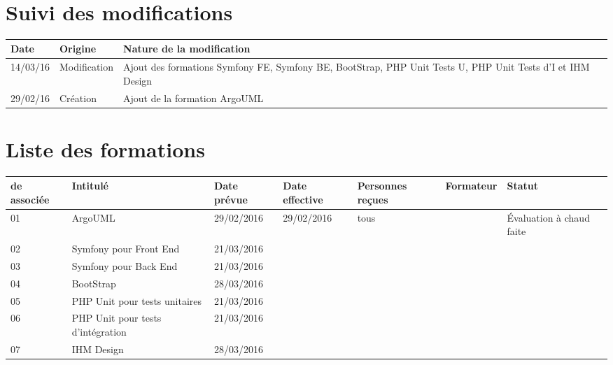 \documentclass[asi,sansVersion]{picInsa}
\begin{document}
	\begin{center}
		\LARGE
		\textsc{
			\PF{}\\
		}
	\end{center}
	\vspace{0.5cm}

	\section*{Suivi des modifications}
	\begin{table}[H]
		\centering
		\begin{tabularx}{18cm}{|p{1.7cm}|p{4cm}|X|}
		\hline
		\rowcolor[gray]{0.85} Date & Origine & Nature de la modification\\\hline
		14/03/16 & Modification & Ajout des formations Symfony FE, Symfony BE, BootStrap, PHP Unit Tests U, PHP Unit Tests d'I et IHM Design \\ \hline
		29/02/16 & Création & Ajout de la formation ArgoUML\\ \hline
		
		\end{tabularx}
	\end{table}
	
	\section*{Liste des formations}
		\begin{longtable}{|p{2cm}|p{3.5cm}|p{2cm}|p{2cm}|p{2cm}|c|p{2cm}|}
			\hline
			\rowcolor{gris2}
			\No{} de \FFCourt{} associée & Intitulé & Date prévue & Date effective & Personnes reçues & Formateur & Statut \\\hline
			01 & ArgoUML & 29/02/2016 & 29/02/2016 & tous & \Julie{} & Évaluation à chaud faite\\\hline
			02 & Symfony pour Front End & 21/03/2016 &  &  &  & \\\hline
			03 & Symfony pour Back End & 21/03/2016 &  &  &  & \\\hline
			04 & BootStrap & 28/03/2016 &  &  &  & \\\hline
			05 & PHP Unit pour tests unitaires & 21/03/2016 &  &  &  & \\\hline
			06 & PHP Unit pour tests d'intégration & 21/03/2016 &  &  &  & \\\hline
			07 & IHM Design & 28/03/2016 &  &  &  & \\\hline
		\end{longtable}
\end{document}
